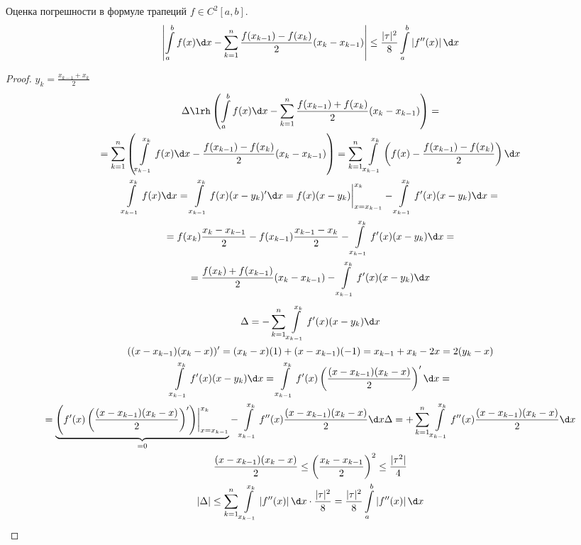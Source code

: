 \begin{theorem}{Оценка погрешности в формуле трапеций}
	$f \in C^2[a, b]$.
	\[ \left| \int\limits_a^b f(x)\d x - \sum_{k=1}^n \frac{f(x_{k-1}) - f(x_k)}{2}(x_k - x_{k-1}) \right| \le \frac{|\tau|^2}8 \int\limits_a^b \left|f''(x)\right|\d x \]
\end{theorem}
\begin{proof}
	$y_k = \frac{x_{k-1} + x_k}2$
	\begin{gather*}
		\Delta \lrh \left(\int\limits_a^b f(x)\d x - \sum_{k=1}^n \frac{f(x_{k-1}) + f(x_k)}{2}(x_k - x_{k-1}) \right) = \\
		= \sum_{k=1}^n \left(\int\limits_{x_{k-1}}^{x_k} f(x)\d x - \frac{f(x_{k-1}) - f(x_k)}{2}(x_k - x_{k-1}) \right)
			= \sum_{k=1}^n \int\limits_{x_{k-1}}^{x_k} \left(f(x) - \frac{f(x_{k-1}) - f(x_k)}{2}\right)\d x \\
		\int\limits_{x_{k-1}}^{x_k} f(x) \d x = \int\limits_{x_{k-1}}^{x_k} f(x)(x - y_k)'\d x = f(x) (x-y_k) \biggr|_{x=x_{k-1}}^{x_k} - \int\limits_{x_{k-1}}^{x_k} f'(x)(x-y_k)\d x = \\
		= f(x_k) \frac{x_k - x_{k-1}}2 - f(x_{k-1}) \frac{x_{k-1} - x_k}2 - \int\limits_{x_{k-1}}^{x_k} f'(x)(x-y_k)\d x = \\
		= \frac{f(x_k) + f(x_{k-1})}2 (x_k - x_{k-1}) - \int\limits_{x_{k-1}}^{x_k} f'(x)(x-y_k)\d x \\
	\end{gather*}
	\begin{gather*}
		\Delta = -\sum_{k=1}^n \int\limits_{x_{k-1}}^{x_k} f'(x)(x-y_k)\d x \\
		((x - x_{k-1})(x_k - x))' = (x_k - x)(1) + (x - x_{k-1})(-1) = x_{k-1} + x_k - 2x = 2(y_k - x) \\
		\int\limits_{x_{k-1}}^{x_k} f'(x)(x-y_k)\d x = \int\limits_{x_{k-1}}^{x_k} f'(x)\left(\frac{(x - x_{k-1})(x_k - x)}2\right)'\d x = \\
		= \underbrace{\left(f'(x)\left(\frac{(x - x_{k-1})(x_k - x)}2\right)'\right)\biggr|_{x = x_{k-1}}^{x_k}}_{=0} - \int\limits_{x_{k-1}}^{x_k} f''(x) \frac{(x - x_{k-1})(x_k - x)}2 \d x
		\Delta = +\sum_{k=1}^n \int\limits_{x_{k-1}}^{x_k} f''(x) \frac{(x - x_{k-1})(x_k - x)}2 \d x \\
		\frac{(x - x_{k-1})(x_k - x)}2 \le \left(\frac{x_k - x_{k-1}}2\right)^2 \le \frac{|\tau^2|}4 \\
		|\Delta| \le \sum_{k=1}^n \int\limits_{x_{k-1}}^{x_k} \left|f''(x)\right| \d x \cdot \frac{|\tau|^2}8 = \frac{|\tau|^2}8 \int\limits_a^b \left|f''(x)\right|\d x
	\end{gather*}
\end{proof}


